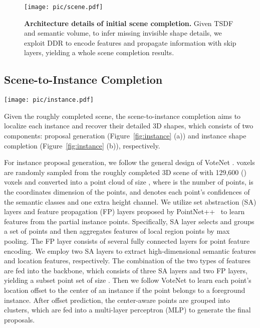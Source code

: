 \documentclass[final]{cvpr}
\begin{document}
\begin{figure}[t!]
    \centering
    \texttt{[image: pic/scene.pdf]}
    \caption{\textbf{Architecture details of initial scene completion.} Given TSDF and semantic volume, to infer missing invisible shape details, we exploit DDR to encode features and propagate information with skip layers, yielding a whole scene completion results.}
    \label{fig:scene}
    \vspace{-0.5cm}
    \end{figure}
\vspace{-0.1cm}
\subsection{Scene-to-Instance Completion}\label{section:ir}
\vspace{-0.1cm}
\begin{figure*}[t]
    \centering
    \texttt{[image: pic/instance.pdf]}
    \vspace{-0.4cm}
    \caption{\textbf{Architecture details of scene-to-instance completion.} We generate high-quality proposals with a backbone and proposal module to get instances' locations, sizes and categories and then locally voxelizes them into higher resolution to recover detailed 3D shapes.}
\label{fig:instance}
    \vspace{-0.6cm}
    \end{figure*}


Given the roughly completed scene, the scene-to-instance completion aims to localize each instance and recover their detailed 3D shapes, which consists of two components: proposal generation (Figure~\ref{fig:instance} (a)) and instance shape completion (Figure~\ref{fig:instance} (b)), respectively. 


For instance proposal generation, we follow the general design of VoteNet \cite{qi2019deep}.  voxels are randomly sampled from the roughly completed 3D scene of  with 129,600 () voxels and converted into a point cloud of size , where  is the number of points,  is the coordinates dimension of the points, and  denotes each point's confidences of the  semantic classes and one extra height channel.
We utilize set abstraction (SA) layers and feature propagation (FP) layers proposed by PointNet++~\cite{qi2017pointnet++} to learn features from the partial instance points.
Specifically, SA layer selects and groups a set of points and then aggregates features of local region points by max pooling. The FP layer consists of several fully connected layers for point feature encoding. 
We employ two SA layers to extract high-dimensional semantic features and location features, respectively. 
The combination of the two types of features are fed into the backbone, which consists of three SA layers and two FP layers, yielding a subset point set of size 
. Then we follow VoteNet \cite{qi2019deep} to learn each point's location offset to the center of an instance if the point belongs to a foreground instance. After offset prediction, the center-aware points are grouped into clusters, which are fed into a multi-layer perceptron (MLP) to generate the final proposals.
\end{document}
